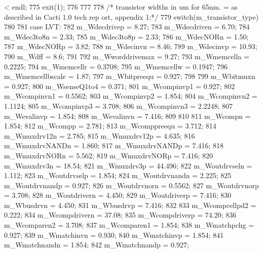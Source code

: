 \begin{DoxyCode}
{{{      < endl;
775                 exit(1);
776         }
777 
778         /* transistor widths in um for 65nm. = as described in Cacti 1.0 tech rep
      ort, appendix 1;*/
779         switch(m_transistor_type)
780         {
781             case LVT:
782                 m_Wdecdrivep = 8.27;
783                 m_Wdecdriven = 6.70;
784                 m_Wdec3to8n = 2.33;
785                 m_Wdec3to8p = 2.33;
786                 m_WdecNORn = 1.50;
787                 m_WdecNORp = 3.82;
788                 m_Wdecinvn = 8.46;
789                 m_Wdecinvp = 10.93;
790                 m_Wdff = 8.6;
791 
792                 m_Wworddrivemax = 9.27;
793                 m_Wmemcella = 0.2225;
794                 m_Wmemcellr = 0.3708;
795                 m_Wmemcellw = 0.1947;
796                 m_Wmemcellbscale = 1.87;
797                 m_Wbitpreequ = 0.927;
798 
799                 m_Wbitmuxn = 0.927;
800                 m_WsenseQ1to4 = 0.371;
801                 m_Wcompinvp1 = 0.927;
802                 m_Wcompinvn1 = 0.5562;
803                 m_Wcompinvp2 = 1.854;
804                 m_Wcompinvn2 = 1.1124;
805                 m_Wcompinvp3 = 3.708;
806                 m_Wcompinvn3 = 2.2248;
807                 m_Wevalinvp = 1.854;
808                 m_Wevalinvn = 7.416;
809 
810 
811                 m_Wcompn = 1.854;
812                 m_Wcompp = 2.781;
813                 m_Wcomppreequ = 3.712;
814                 m_Wmuxdrv12n = 2.785;
815                 m_Wmuxdrv12p = 4.635;
816                 m_WmuxdrvNANDn = 1.860;
817                 m_WmuxdrvNANDp = 7.416;
818                 m_WmuxdrvNORn = 5.562;
819                 m_WmuxdrvNORp = 7.416;
820                 m_Wmuxdrv3n = 18.54;
821                 m_Wmuxdrv3p = 44.496;
822                 m_Woutdrvseln = 1.112;
823                 m_Woutdrvselp = 1.854;
824                 m_Woutdrvnandn = 2.225;
825                 m_Woutdrvnandp = 0.927;
826                 m_Woutdrvnorn = 0.5562;
827                 m_Woutdrvnorp = 3.708;
828                 m_Woutdrivern = 4.450;
829                 m_Woutdriverp = 7.416;
830                 m_Wbusdrvn = 4.450;
831                 m_Wbusdrvp = 7.416;
832 
833                 m_Wcompcellpd2 = 0.222;
834                 m_Wcompdrivern = 37.08;
835                 m_Wcompdriverp = 74.20;
836                 m_Wcomparen2 = 3.708;
837                 m_Wcomparen1 = 1.854;
838                 m_Wmatchpchg = 0.927;
839                 m_Wmatchinvn = 0.930;
840                 m_Wmatchinvp = 1.854;
841                 m_Wmatchnandn = 1.854;
842                 m_Wmatchnandp = 0.927;
}}}
\end{DoxyCode}
